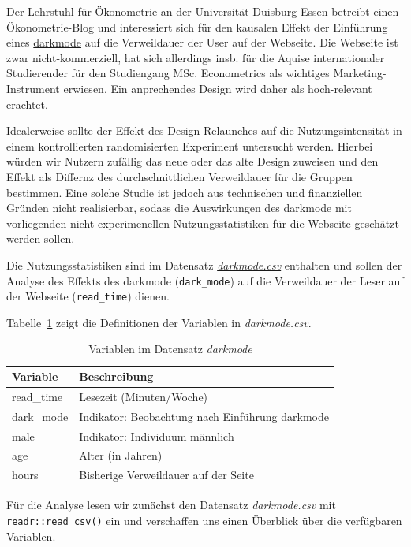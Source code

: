 \documentclass[
  a4paper,
  DIV=11,
  oneside]{scrreprt}
\begin{document}
Der Lehrstuhl für Ökonometrie an der Universität Duisburg-Essen betreibt
einen Ökonometrie-Blog und interessiert sich für den kausalen Effekt der
Einführung eines
\href{https://en.wikipedia.org/wiki/Wikipedia:Dark_mode}{darkmode} auf
die Verweildauer der User auf der Webseite. Die Webseite ist zwar
nicht-kommerziell, hat sich allerdings insb. für die Aquise
internationaler Studierender für den Studiengang MSc. Econometrics als
wichtiges Marketing-Instrument erwiesen. Ein anprechendes Design wird
daher als hoch-relevant erachtet.

Idealerweise sollte der Effekt des Design-Relaunches auf die
Nutzungsintensität in einem kontrollierten randomisierten Experiment
untersucht werden. Hierbei würden wir Nutzern zufällig das neue oder das
alte Design zuweisen und den Effekt als Differnz des durchschnittlichen
Verweildauer für die Gruppen bestimmen. Eine solche Studie ist jedoch
aus technischen und finanziellen Gründen nicht realisierbar, sodass die
Auswirkungen des darkmode mit vorliegenden nicht-experimenellen
Nutzungsstatistiken für die Webseite geschätzt werden sollen.

Die Nutzungsstatistiken sind im Datensatz
\href{https://raw.githubusercontent.com/mca91/kasa_data/main/darkmode.csv}{\emph{darkmode.csv}}
enthalten und sollen der Analyse des Effekts des darkmode
(\texttt{dark\_mode}) auf die Verweildauer der Leser auf der Webseite
(\texttt{read\_time}) dienen.

Tabelle~\ref{tbl-darkmode} zeigt die Definitionen der Variablen in
\emph{darkmode.csv}.

\begin{longtable}{ll}

\caption{\label{tbl-darkmode}Variablen im Datensatz \emph{darkmode}}

\tabularnewline

\toprule
Variable & Beschreibung \\ 
\midrule\addlinespace[2.5pt]
read\_time & Lesezeit (Minuten/Woche) \\ 
dark\_mode & Indikator: Beobachtung nach Einführung darkmode \\ 
male & Indikator: Individuum männlich \\ 
age & Alter (in Jahren) \\ 
hours & Bisherige Verweildauer auf der Seite \\ 
\bottomrule

\end{longtable}

Für die Analyse lesen wir zunächst den Datensatz \emph{darkmode.csv} mit
\texttt{readr::read\_csv()} ein und verschaffen uns einen Überblick über
die verfügbaren Variablen.
\end{document}
